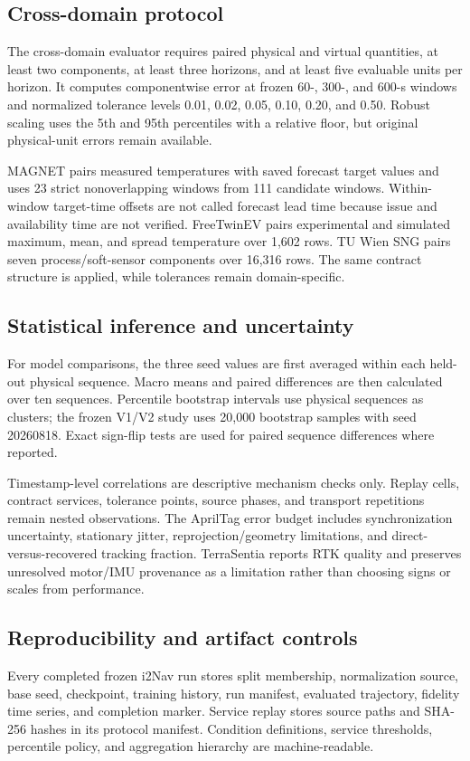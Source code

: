 \documentclass[journal,onecolumn]{IEEEtran}
\begin{document}
\subsection{Cross-domain protocol}
The cross-domain evaluator requires paired physical and virtual quantities, at least two components, at least three horizons, and at least five evaluable units per horizon. It computes componentwise error at frozen 60-, 300-, and 600-s windows and normalized tolerance levels 0.01, 0.02, 0.05, 0.10, 0.20, and 0.50. Robust scaling uses the 5th and 95th percentiles with a relative floor, but original physical-unit errors remain available.

MAGNET pairs measured temperatures with saved forecast target values and uses 23 strict nonoverlapping windows from 111 candidate windows. Within-window target-time offsets are not called forecast lead time because issue and availability time are not verified. FreeTwinEV pairs experimental and simulated maximum, mean, and spread temperature over 1,602 rows. TU Wien SNG pairs seven process/soft-sensor components over 16,316 rows. The same contract structure is applied, while tolerances remain domain-specific.

\subsection{Statistical inference and uncertainty}
For model comparisons, the three seed values are first averaged within each held-out physical sequence. Macro means and paired differences are then calculated over ten sequences. Percentile bootstrap intervals use physical sequences as clusters; the frozen V1/V2 study uses 20,000 bootstrap samples with seed 20260818. Exact sign-flip tests are used for paired sequence differences where reported.

Timestamp-level correlations are descriptive mechanism checks only. Replay cells, contract services, tolerance points, source phases, and transport repetitions remain nested observations. The AprilTag error budget includes synchronization uncertainty, stationary jitter, reprojection/geometry limitations, and direct-versus-recovered tracking fraction. TerraSentia reports RTK quality and preserves unresolved motor/IMU provenance as a limitation rather than choosing signs or scales from performance.

\subsection{Reproducibility and artifact controls}
Every completed frozen i2Nav run stores split membership, normalization source, base seed, checkpoint, training history, run manifest, evaluated trajectory, fidelity time series, and completion marker. Service replay stores source paths and SHA-256 hashes in its protocol manifest. Condition definitions, service thresholds, percentile policy, and aggregation hierarchy are machine-readable.
\end{document}
